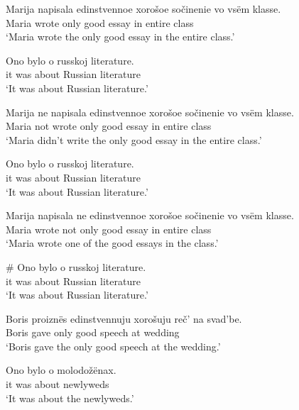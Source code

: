 \begin{exe}
	\ex \begin{xlist}
		\ex \gll Marija napisala edinstvennoe xoro\v{s}oe so\v{c}inenie vo vs\"{e}m klasse.\\
		Maria wrote only good essay in entire class\\
		\glt `Maria wrote the only good essay in the entire class.'

		\ex \gll Ono bylo o russkoj literature.\\
		it was about Russian literature\\
		\glt `It was about Russian literature.'
	\end{xlist}

	\ex \begin{xlist}
		\ex \gll Marija ne napisala edinstvennoe xoro\v{s}oe so\v{c}inenie vo vs\"{e}m klasse.\\
		Maria not wrote only good essay in entire class\\
		\glt `Maria didn't write the only good essay in the entire class.'

		\ex \gll Ono bylo o russkoj literature.\\
		it was about Russian literature\\
		\glt `It was about Russian literature.'
	\end{xlist}

	\ex \label{maria3} \begin{xlist}
		\ex \gll Marija napisala ne edinstvennoe xoro\v{s}oe so\v{c}inenie vo vs\"{e}m klasse.\\
		Maria wrote not only good essay in entire class\\
		\glt `Maria wrote one of the good essays in the class.'

		\ex \gll \# Ono bylo o russkoj literature.\\
		{} it was about Russian literature\\
		\glt `It was about Russian literature.'
	\end{xlist}

	\ex \begin{xlist}
		\ex \gll Boris proizn\"{e}s edinstvennuju xoro\v{s}uju re\v{c}' na svad'be.\\
		Boris gave only good speech at wedding\\
		\glt `Boris gave the only good speech at the wedding.'

		\ex \gll Ono bylo o molodo\v{z}\"{e}nax.\\
		it was about newlyweds\\
		\glt `It was about the newlyweds.'
	\end{xlist}


\end{exe}

